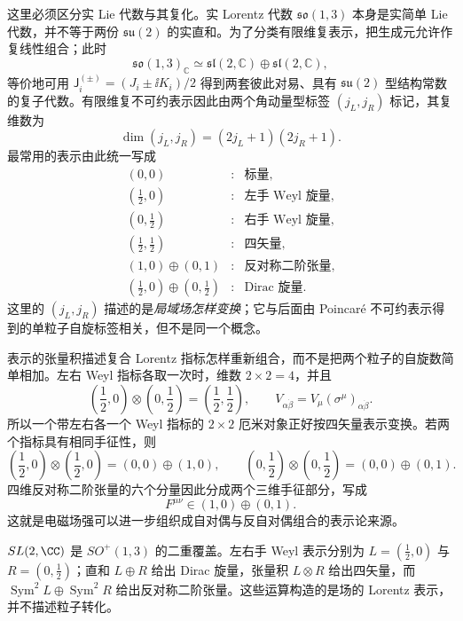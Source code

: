 这里必须区分实 Lie 代数与其复化。实 Lorentz 代数 $\mathfrak{so}(1,3)$ 本身是实简单 Lie 代数，并不等于两份 $\mathfrak{su}(2)$ 的实直和。为了分类有限维复表示，把生成元允许作复线性组合；此时
\begin{equation*}
 \mathfrak{so}(1,3)_\mathbb C
 \simeq \mathfrak{sl}(2,\mathbb C)\oplus\mathfrak{sl}(2,\mathbb C),
\end{equation*}
等价地可用 $\mathsf J_i^{(\pm)}=(J_i\pm\ii K_i)/2$ 得到两套彼此对易、具有 $\mathfrak{su}(2)$ 型结构常数的复子代数。有限维复不可约表示因此由两个角动量型标签 $(j_L,j_R)$ 标记，其复维数为
\begin{equation}
 {\dim(j_L,j_R)=(2j_L+1)(2j_R+1).}
 \label{eq:lorentz-irrep-dimension-dp8}
\end{equation}
最常用的表示由此统一写成
\begin{equation}
 \begin{array}{ccl}
 (0,0) &:& \text{标量},\\[2pt]
 (\tfrac12,0) &:& \text{左手 Weyl 旋量},\\[2pt]
 (0,\tfrac12) &:& \text{右手 Weyl 旋量},\\[2pt]
 (\tfrac12,\tfrac12) &:& \text{四矢量},\\[2pt]
 (1,0)\oplus(0,1) &:& \text{反对称二阶张量},\\[2pt]
 (\tfrac12,0)\oplus(0,\tfrac12) &:& \text{Dirac 旋量}.
 \end{array}
 \label{eq:lorentz-irrep-dictionary-dp8}
\end{equation}
这里的 $(j_L,j_R)$ 描述的是\emph{局域场怎样变换}；它与后面由 Poincar\'e 不可约表示得到的单粒子自旋标签相关，但不是同一个概念。


表示的张量积描述复合 Lorentz 指标怎样重新组合，而不是把两个粒子的自旋数简单相加。左右 Weyl 指标各取一次时，维数 $2\times2=4$，并且
\begin{equation}
 {
 \left(\frac12,0\right)\otimes\left(0,\frac12\right)
 =\left(\frac12,\frac12\right),
 \qquad
 V_{\alpha\dot\beta}=V_\mu(\sigma^\mu)_{\alpha\dot\beta}.}
 \label{eq:weyl-vector-product-r68}
\end{equation}
所以一个带左右各一个 Weyl 指标的 $2\times2$ 厄米对象正好按四矢量表示变换。若两个指标具有相同手征性，则
\begin{equation}
 {
 \left(\frac12,0\right)\otimes\left(\frac12,0\right)
 =(0,0)\oplus(1,0),
 \qquad
 \left(0,\frac12\right)\otimes\left(0,\frac12\right)
 =(0,0)\oplus(0,1).}
 \label{eq:weyl-same-chirality-product-r68}
\end{equation}
四维反对称二阶张量的六个分量因此分成两个三维手征部分，写成
\begin{equation}
 {F^{\mu\nu}\in(1,0)\oplus(0,1).}
 \label{eq:twoform-chiral-decomposition-r68}
\end{equation}
这就是电磁场强可以进一步组织成自对偶与反自对偶组合的表示论来源。

\label{fig:lorentz-representation-map-dp8}
$SL(2,\CC)$ 是 $SO^+(1,3)$ 的二重覆盖。左右手 Weyl 表示分别为 $L=(\tfrac12,0)$ 与 $R=(0,\tfrac12)$；直和 $L\oplus R$ 给出 Dirac 旋量，张量积 $L\otimes R$ 给出四矢量，而 $\operatorname{Sym}^2L\oplus\operatorname{Sym}^2R$ 给出反对称二阶张量。这些运算构造的是场的 Lorentz 表示，并不描述粒子转化。
